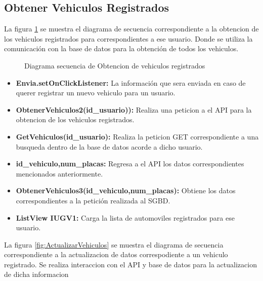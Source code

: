 \subsection{Obtener Vehiculos Registrados}

La figura \ref{fig:ObtencionVehiculos} se muestra el diagrama de secuencia correspondiente a la obtencion de los vehiculos registrados para correspondientes a ese usuario. Donde se utiliza la comunicación con la base de datos para la obtención de todos los vehiculos.

\begin{figure}[htbp!]
	\centering
	\caption{Diagrama secuencia de Obtencion de vehiculos registrados}
	\label{fig:ObtencionVehiculos}
\end{figure}
\begin{itemize}
	\item \textbf{Envia.setOnClickListener:} La información que sera enviada en caso de querer registrar un nuevo vehiculo para un usuario.
	\item \textbf{ObtenerVehiculos2(id_usuario)):} Realiza una peticion a el API para la obtencion de los vehiculos registrados.
	\item \textbf{GetVehiculos(id_usuario):} Realiza la peticion GET correspondiente a una busqueda dentro de la base de datos acorde a dicho usuario.
	\item \textbf{id_vehiculo,num_placas:} Regresa a el API los datos correspondientes mencionados anteriormente.
	\item \textbf{ObtenerVehiculos3(id_vehiculo,num_placas):} Obtiene los datos correspondientes a la petición realizada al SGBD.
	\item \textbf{ListView IUGV1:} Carga la lista de automoviles registrados para ese usuario.

\end{itemize}

La figura \ref{fig:ActualizarVehiculos} se muestra el diagrama de secuencia correspondiente a la actualizacion de datos correspodiente  a un vehiculo registrado. Se realiza interaccion con el API y base de datos para la actualizacion de dicha informacion

